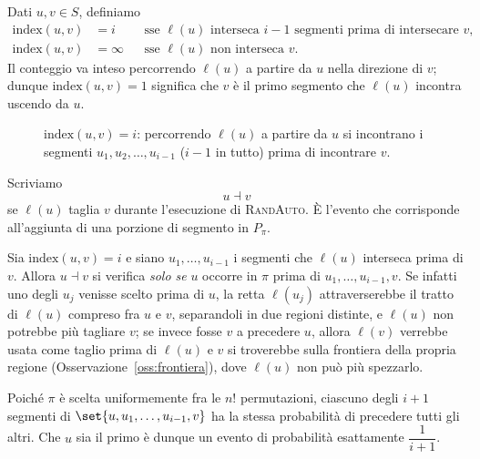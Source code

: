 \begin{definizione}\label{def:index}
Dati $u,v\in S$, definiamo
\begin{align*}
  \mathrm{index}(u,v)&=i
    &&\text{sse } \ell(u) \text{ interseca } i-1 \text{ segmenti prima di intersecare } v,\\
  \mathrm{index}(u,v)&=\infty
    &&\text{sse } \ell(u) \text{ non interseca } v.
\end{align*}
Il conteggio va inteso percorrendo $\ell(u)$ a partire da $u$ nella direzione di $v$; dunque
$\mathrm{index}(u,v)=1$ significa che $v$ è il primo segmento che $\ell(u)$ incontra uscendo
da $u$.
\end{definizione}

\begin{figure}[H]
\centering

\caption{$\mathrm{index}(u,v)=i$: percorrendo $\ell(u)$ a partire da $u$ si incontrano i
segmenti $u_1,u_2,\dots,u_{i-1}$ ($i-1$ in tutto) prima di incontrare $v$.}
\label{fig:randauto-index}
\end{figure}

\begin{definizione}\label{def:dashv}
Scriviamo
\[
  u\dashv v
\]
se $\ell(u)$ taglia $v$ durante l'esecuzione di \textsc{RandAuto}. È l'evento che corrisponde
all'aggiunta di una porzione di segmento in $P_\pi$.
\end{definizione}

\begin{osservazione}\label{oss:primo-in-pi}
Sia $\mathrm{index}(u,v)=i$ e siano $u_1,\dots,u_{i-1}$ i segmenti che $\ell(u)$ interseca
prima di $v$. Allora $u\dashv v$ si verifica \emph{solo se} $u$ occorre in $\pi$ prima di
$u_1,\dots,u_{i-1},v$. Se infatti uno degli $u_j$ venisse scelto prima di $u$, la retta
$\ell(u_j)$ attraverserebbe il tratto di $\ell(u)$ compreso fra $u$ e $v$, separandoli in due
regioni distinte, e $\ell(u)$ non potrebbe più tagliare $v$; se invece fosse $v$ a precedere
$u$, allora $\ell(v)$ verrebbe usata come taglio prima di $\ell(u)$ e $v$ si troverebbe sulla
frontiera della propria regione (Osservazione~\ref{oss:frontiera}), dove $\ell(u)$ non può
più spezzarlo.

Poiché $\pi$ è scelta uniformemente fra le $n!$ permutazioni, ciascuno degli $i+1$ segmenti
di $\set{u,u_1,\dots,u_{i-1},v}$ ha la stessa probabilità di precedere tutti gli altri. Che
$u$ sia il primo è dunque un evento di probabilità esattamente $\dfrac{1}{i+1}$.
\end{osservazione}

